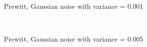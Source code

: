 \documentclass[10pt,a4paper]{article}
\begin{document}
\begin{figure}
  \centering
     \\
  \caption{Prewitt, Gaussian noise with variance = 0.001}
  \label{fig:prewitt_001}
\end{figure}

\begin{figure}
  \centering
     \\
  \caption{Prewitt, Gaussian noise with variance = 0.005}
  \label{fig:prewitt_005}
\end{figure}
\end{document}
